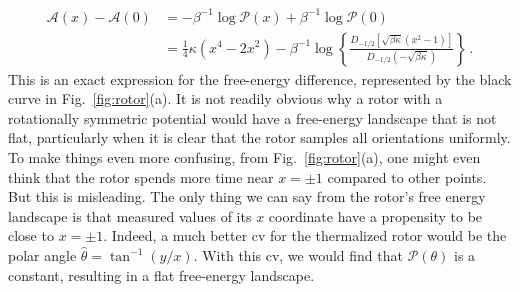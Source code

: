 \begin{subappendices}
\begin{equation}
\begin{aligned}\label{eq:rotor_exact_a}
  \mathscr{A}(x) - \mathscr{A}(0) &= -\beta^{-1}\log{\mathscr{P}(x)} +\beta^{-1}\log{\mathscr{P}(0)}\\
                                                      &= \tfrac{1}{4}\kappa(x^4 - 2x^2) - \beta^{-1}\log\left\{\frac{D_{-1/2}\left[\sqrt{\beta\kappa}(x^2-1)\right]}{D_{-1/2}\left(-\sqrt{\beta\kappa}\right)}\right\}\,.
\end{aligned}
\end{equation}
%
This is an exact expression for the free-energy difference, represented by the black curve in Fig.~\ref{fig:rotor}(a).
It is not readily obvious why a rotor with a rotationally symmetric potential would have a free-energy landscape that is not flat, particularly when it is clear that the rotor samples all orientations uniformly.
To make things even more confusing, from Fig.~\ref{fig:rotor}(a), one might even think that the rotor spends more time near $x=\pm 1$ compared to other points.
But this is misleading.
The only thing we can say from the rotor's free energy landscape is that measured values of its $x$ coordinate have a propensity to be close to $x=\pm 1$.
Indeed, a much better \ac{cv} for the thermalized rotor would be the polar angle $\hat{\theta} = \tan^{-1}(y/x)$.
With this \ac{cv}, we would find that $\mathscr{P}(\theta)$ is a constant, resulting in a flat free-energy landscape.


\end{subappendices}
